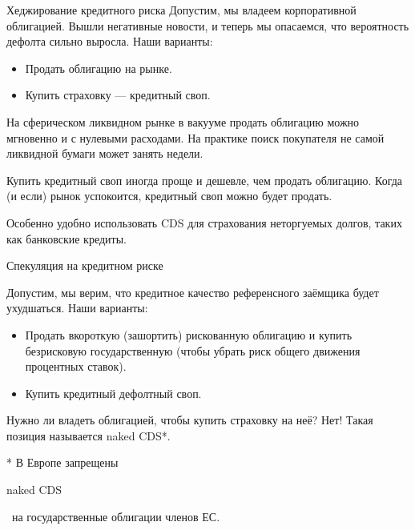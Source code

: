 \documentclass{beamer}
\newcommand{\en}[1]{\begin{otherlanguage}{english}#1\end{otherlanguage}}
\begin{document}
\begin{frame}{Хеджирование кредитного риска}
\justify
Допустим, мы владеем корпоративной облигацией. Вышли негативные новости, и теперь мы опасаемся, что вероятность дефолта сильно выросла. Наши варианты:
\begin{itemize}
\item Продать облигацию на рынке.
\item Купить страховку --- кредитный своп.
\end{itemize}

\justify
На сферическом ликвидном рынке в вакууме продать облигацию можно мгновенно и с нулевыми расходами. На практике поиск покупателя не самой ликвидной бумаги может занять недели.

\justify
Купить кредитный своп иногда проще и дешевле, чем продать облигацию. Когда (и если) рынок успокоится, кредитный своп можно будет продать.

\justify
Особенно удобно использовать CDS для страхования неторгуемых долгов, таких как банковские кредиты.
\end{frame}



\begin{frame}{Спекуляция на кредитном риске}

\justify
Допустим, мы верим, что кредитное качество референсного заёмщика будет ухудшаться. Наши варианты:
\begin{itemize}
\justifying
\item Продать вкороткую (зашортить) рискованную облигацию и купить безрисковую государственную (чтобы убрать риск общего движения процентных ставок).
\item Купить кредитный дефолтный своп.
\end{itemize}

\justify
Нужно ли владеть облигацией, чтобы купить страховку на неё? Нет! Такая позиция называется naked CDS*.

\justify
* В Европе запрещены \en{naked CDS}\ на государственные облигации членов ЕС.
\end{frame}


\renewcommand{\swapPartyNode}[4]{

	\draw (#1, #2)
		node[
			rectangle,
			draw,
			rounded corners,
			anchor = south,
			minimum height = 0.8cm,
			minimum width = 2.8cm
		]
		(#4)
		{#3};
}

\newcommand{\paymentFlow}[4] {
	\draw [
		->,
		>=triangle 90
	]
	(#1) -- (#2)
	node[
		pos = 0.5,
		anchor = #4
	]
	{#3};
}
\end{document}
